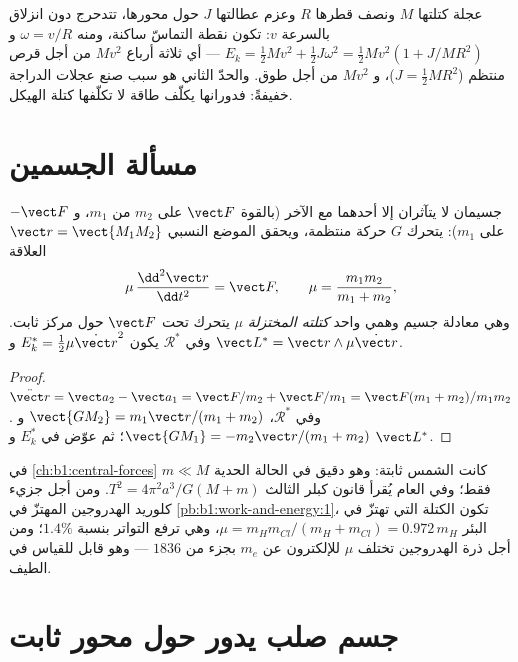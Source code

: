 \begin{example}\label{ex:b1:systems-of-points:rolling}
عجلة كتلتها $M$ ونصف قطرها $R$ وعزم عطالتها $J$ حول محورها،
تتدحرج دون انزلاق بالسرعة $v$: تكون نقطة التماسّ ساكنة، ومنه
$\omega = v/R$ و $E_k = \tfrac12 Mv^2 + \tfrac12 J\omega^2 = \tfrac12 Mv^2(1 +
J/MR^2)$ --- أي ثلاثة أرباع $Mv^2$ من أجل قرص منتظم ($J = \tfrac12 MR^2$)،
و $Mv^2$ من أجل طوق. والحدّ الثاني هو سبب صنع عجلات الدراجة
خفيفةً: فدورانها يكلّف طاقة لا تكلّفها كتلة الهيكل.
\end{example}

\section{مسألة الجسمين}

\begin{proposition}\label{prop:b1:systems-of-points:twobody}
جسيمان لا يتآثران إلا أحدهما مع الآخر (بالقوة $\vect F$ على $m_2$
من $m_1$، و $-\vect F$ على $m_1$): يتحرك $G$ حركة منتظمة، ويحقق الموضع
النسبي $\vect r = \vect{M_1M_2}$ العلاقة
\[
\mu\,\frac{\dd^2\vect r}{\dd t^2} = \vect F, \qquad \mu = \frac{m_1m_2}{m_1 + m_2},
\]
وهي معادلة جسيم وهمي واحد \emph{كتلته المختزلة} $\mu$
يتحرك تحت $\vect F$ حول مركز ثابت. وفي $\mathcal R^*$ يكون $E_k^* =
\tfrac12\mu\dot{\vect r}^2$ و $\vect L^* = \vect r\wedge\mu\dot{\vect r}$.
\end{proposition}

\begin{proof}
$\ddot{\vect r} = \vect a_2 - \vect a_1 = \vect F/m_2 + \vect F/m_1 = \vect F(m_1 +
m_2)/m_1m_2$. وفي $\mathcal R^*$، $\vect{GM_2} = m_1\vect r/(m_1 + m_2)$ و
$\vect{GM_1} = -m_2\vect r/(m_1 + m_2)$؛ ثم عوّض في $E_k^*$ و $\vect L^*$.
\end{proof}

\begin{example}\label{ex:b1:systems-of-points:reduced}
في \cref{ch:b1:central-forces} كانت الشمس ثابتة: وهو دقيق في
الحالة الحدية $m \ll M$ فقط؛ وفي العام يُقرأ قانون كبلر الثالث $T^2 = 4\pi^2a^3/G(M +
m)$. ومن أجل جزيء كلوريد الهدروجين المهتزّ في \cref{pb:b1:work-and-energy:1}،
تكون الكتلة التي تهتزّ في البئر $\mu = m_Hm_{Cl}/(m_H + m_{Cl}) =
0.972\,m_H$، وهي ترفع التواتر بنسبة $1.4\%$؛ ومن أجل ذرة
الهدروجين تختلف $\mu$ للإلكترون عن $m_e$ بجزء من $1836$ ---
وهو قابل للقياس في الطيف.
\end{example}

\section{جسم صلب يدور حول محور ثابت}

